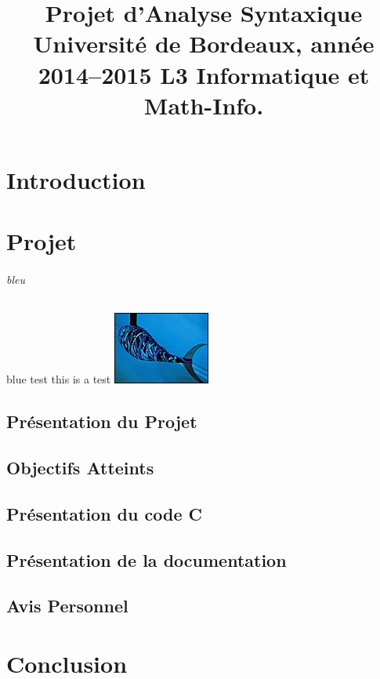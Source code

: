 \documentclass{report}
\title{Projet d’Analyse Syntaxique Université de Bordeaux, année 2014–2015 L3 Informatique et Math-Info.}
\begin{document}
\maketitle
\tableofcontents
\part{Introduction}
\part{Projet}
\paragraph{bleu}{\color{blue}blue test this is a test }
\includegraphics{pic.jpg}
\chapter{Présentation du Projet}
\chapter{Objectifs Atteints}
\chapter{Présentation du code C}
\chapter{Présentation de la documentation}
\chapter{Avis Personnel}
\part{Conclusion}
\end{document}
